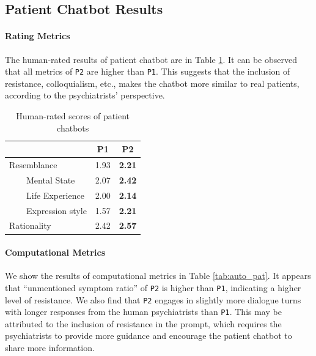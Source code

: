 \subsection{Patient Chatbot Results}
\paragraph{Rating Metrics}

The human-rated results of patient chatbot are in Table \ref{tab:human_pat}. It can be observed that all metrics of \texttt{P2}
are higher than \texttt{P1}. This suggests that the inclusion of resistance, colloquialism, etc., makes the chatbot more similar to real patients, according to the psychiatrists' perspective.

\begin{table}[ht]
    \small
    \centering
    \begin{tabular}{l|cc}
    \hline
     & P1 & P2 \\ 
    \hline
    Resemblance & 1.93 & \textbf{2.21} \\
    ~~~~Mental State & 2.07 & \textbf{2.42} \\
    ~~~~Life Experience & 2.00 & \textbf{2.14}  \\
    ~~~~Expression style & 1.57 & \textbf{2.21} \\
    \hline
    Rationality & 2.42 & \textbf{2.57}  \\
    \hline
    \end{tabular}
    \caption{Human-rated scores of patient chatbots}
    \label{tab:human_pat}
\end{table}

\paragraph{Computational Metrics}
We show the results of computational metrics in Table \ref{tab:auto_pat}. It appears that ``unmentioned symptom ratio'' of \texttt{P2} is higher than \texttt{P1}, indicating a higher level of resistance. We also find that \texttt{P2} engages in slightly more dialogue turns with longer responses from the human psychiatrists than \texttt{P1}. This may be attributed to the inclusion of resistance in the prompt, which requires the psychiatrists to provide more guidance and encourage the patient chatbot to share more information. 

